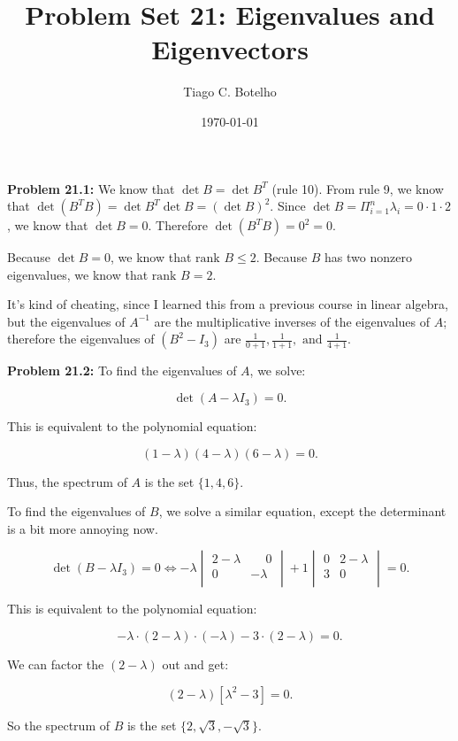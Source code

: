 \documentclass{article}
\title{Problem Set 21: Eigenvalues and Eigenvectors}
\author{Tiago C. Botelho}
\date{\today}
\begin{document}
\maketitle

\noindent \textbf{Problem 21.1:}  We know that $\det B = \det B^{T}$ (rule 10). From rule 9, we know that $\det (B^{T}B) = \det B^{T} \det B = (\det B)^{2}$. Since $\det B = \Pi_{i=1}^{n} \lambda_i = 0 \cdot 1 \cdot 2$, we know that $\det B = 0$. Therefore $\det(B^{T}B) = 0^{2} = 0$.

Because $\det B = 0$, we know that $\text{rank }B \leq 2$. Because $B$ has two nonzero eigenvalues, we know that $\text{rank }B = 2$.

It's kind of cheating, since I learned this from a previous course in linear algebra, but the eigenvalues of $A^{-1}$ are the multiplicative inverses of the eigenvalues of $A$; therefore the eigenvalues of $(B^{2} - I_3)$ are $\frac{1}{0 + 1}, \frac{1}{1 + 1}, \text{ and } \frac{1}{4 + 1}$.

\noindent \textbf{Problem 21.2:} To find the eigenvalues of $A$, we solve:

\[
\det(A - \lambda I_3) = 0.
\]

This is equivalent to the polynomial equation:

\[
(1 - \lambda)(4 - \lambda)(6 - \lambda) = 0.
\]

Thus, the spectrum of $A$ is the set $\{1, 4, 6\}$.

To find the eigenvalues of $B$, we solve a similar equation, except the determinant is a bit more annoying now.

\[
\det(B - \lambda I_3) = 0 \iff -\lambda \begin{vmatrix}
2 - \lambda & \phantom{-}0\\
0 & -\lambda\\
\end{vmatrix}
+1\begin{vmatrix}
0 & 2-\lambda\\
3 & 0\\
\end{vmatrix}
=0.
\]

This is equivalent to the polynomial equation:

\[
-\lambda \cdot (2 - \lambda) \cdot (-\lambda) - 3 \cdot (2-\lambda) = 0.
\]

We can factor the $(2-\lambda)$ out and get:

\[
(2-\lambda)[\lambda^{2} - 3] = 0.
\]

So the spectrum of $B$ is the set $\{2, \sqrt{3}, -\sqrt{3}\}$.
\end{document}
